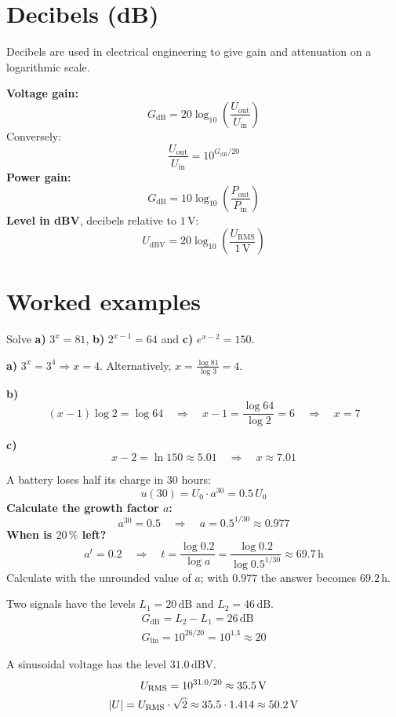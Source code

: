 \section{Decibels (dB)}
\label{c10:sec:decibel}
Decibels are used in electrical engineering to give gain and attenuation on a logarithmic scale.

\textbf{Voltage gain:}
\[
  G_{\text{dB}} = 20 \log_{10}\left(\frac{U_{\text{out}}}{U_{\text{in}}}\right)
\]
Conversely:
\[
  \frac{U_{\text{out}}}{U_{\text{in}}} = 10^{G_{\text{dB}}/20}
\]
\textbf{Power gain:}
\[
  G_{\text{dB}} = 10 \log_{10}\left(\frac{P_{\text{out}}}{P_{\text{in}}}\right)
\]
\textbf{Level in dBV}, decibels relative to $1\,\text{V}$:
\[
  U_{\text{dBV}} = 20 \log_{10}\left(\frac{U_{\text{RMS}}}{1\,\text{V}}\right)
\]

\section{Worked examples}
\label{c10:sec:typexempel}

\begin{exempel}
Solve \textbf{a)} $3^x = 81$, \textbf{b)} $2^{x-1} = 64$ and \textbf{c)} $e^{x-2} = 150$.

\textbf{a)} $3^x = 3^4 \Rightarrow x = 4$. Alternatively, $x = \frac{\log 81}{\log 3} = 4$.

\textbf{b)}
\[
  (x-1)\log 2 = \log 64 \quad \Rightarrow \quad x - 1 = \frac{\log 64}{\log 2} = 6
  \quad \Rightarrow \quad x = 7
\]

\textbf{c)}
\[
  x - 2 = \ln 150 \approx 5.01 \quad \Rightarrow \quad x \approx 7.01
\]
\end{exempel}

\begin{exempel}
A battery loses half its charge in $30$ hours:
\[
  u(30) = U_0 \cdot a^{30} = 0.5\,U_0
\]
\textbf{Calculate the growth factor $a$:}
\[
  a^{30} = 0.5 \quad \Rightarrow \quad a = 0.5^{1/30} \approx 0.977
\]
\textbf{When is $20\,\%$ left?}
\[
  a^t = 0.2 \quad \Rightarrow \quad t = \frac{\log 0.2}{\log a}
  = \frac{\log 0.2}{\log 0.5^{1/30}} \approx 69.7\,\text{h}
\]
Calculate with the unrounded value of $a$; with $0.977$ the answer becomes $69.2\,\text{h}$.
\end{exempel}

\begin{exempel}
Two signals have the levels $L_1 = 20\,\text{dB}$ and $L_2 = 46\,\text{dB}$.
\begin{gather*}
  G_{\text{dB}} = L_2 - L_1 = 26\,\text{dB} \\
  G_{\text{lin}} = 10^{26/20} = 10^{1.3} \approx 20
\end{gather*}
\end{exempel}

\begin{exempel}
A sinusoidal voltage has the level $31.0\,\text{dBV}$.
\begin{gather*}
  U_{\text{RMS}} = 10^{31.0/20} \approx 35.5\,\text{V} \\
  \lvert U\rvert = U_{\text{RMS}} \cdot \sqrt{2} \approx 35.5 \cdot 1.414 \approx 50.2\,\text{V}
\end{gather*}
\end{exempel}
